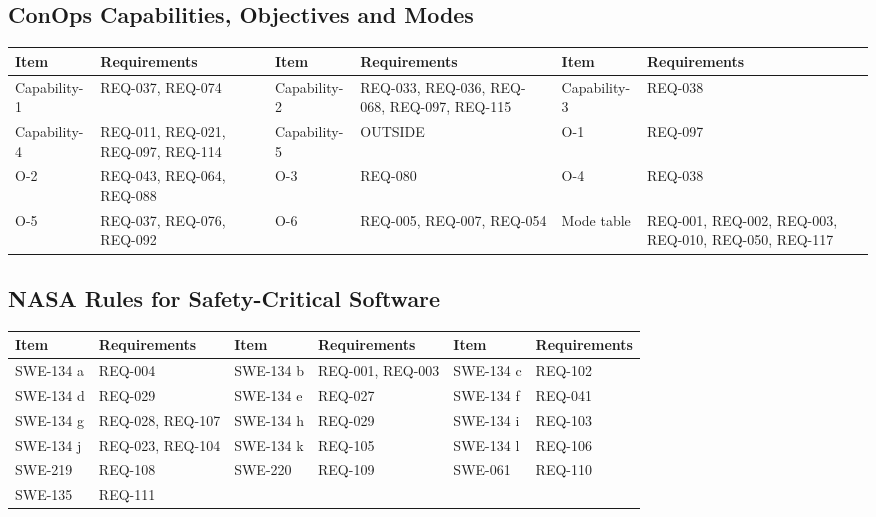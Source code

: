 \documentclass[11pt,a4paper]{article}
\begin{document}
\subsection{ConOps Capabilities, Objectives and Modes}
{\footnotesize
\begin{longtable}{@{}>{\raggedright\arraybackslash}p{2.1cm}>{\raggedright\arraybackslash}p{2.5cm}>{\raggedright\arraybackslash}p{2.1cm}>{\raggedright\arraybackslash}p{2.5cm}>{\raggedright\arraybackslash}p{2.1cm}>{\raggedright\arraybackslash}p{2.5cm}@{}}
\toprule
Item & Requirements & Item & Requirements & Item & Requirements \\
\midrule
\endhead
Capability-1 & REQ-037, REQ-074 & Capability-2 & REQ-033, REQ-036, REQ-068, REQ-097, REQ-115 & Capability-3 & REQ-038 \\
Capability-4 & REQ-011, REQ-021, REQ-097, REQ-114 & Capability-5 & OUTSIDE & O-1 & REQ-097 \\
O-2 & REQ-043, REQ-064, REQ-088 & O-3 & REQ-080 & O-4 & REQ-038 \\
O-5 & REQ-037, REQ-076, REQ-092 & O-6 & REQ-005, REQ-007, REQ-054 & Mode table & REQ-001, REQ-002, REQ-003, REQ-010, REQ-050, REQ-117 \\
\bottomrule
\end{longtable}}

\subsection{NASA Rules for Safety-Critical Software}
{\footnotesize
\begin{longtable}{@{}>{\raggedright\arraybackslash}p{2.1cm}>{\raggedright\arraybackslash}p{2.5cm}>{\raggedright\arraybackslash}p{2.1cm}>{\raggedright\arraybackslash}p{2.5cm}>{\raggedright\arraybackslash}p{2.1cm}>{\raggedright\arraybackslash}p{2.5cm}@{}}
\toprule
Item & Requirements & Item & Requirements & Item & Requirements \\
\midrule
\endhead
SWE-134 a & REQ-004 & SWE-134 b & REQ-001, REQ-003 & SWE-134 c & REQ-102 \\
SWE-134 d & REQ-029 & SWE-134 e & REQ-027 & SWE-134 f & REQ-041 \\
SWE-134 g & REQ-028, REQ-107 & SWE-134 h & REQ-029 & SWE-134 i & REQ-103 \\
SWE-134 j & REQ-023, REQ-104 & SWE-134 k & REQ-105 & SWE-134 l & REQ-106 \\
SWE-219 & REQ-108 & SWE-220 & REQ-109 & SWE-061 & REQ-110 \\
SWE-135 & REQ-111 &  &  &  &  \\
\bottomrule
\end{longtable}}
\end{document}
